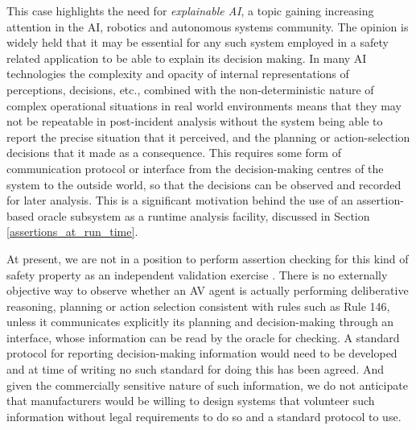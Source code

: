 This case highlights the need for \emph{explainable AI}, a topic gaining increasing attention in the AI, robotics and autonomous systems community. The opinion is widely held \cite{deeks2019judicial, o2019legal, wortham2020transparency} that it may be essential for any such system employed in a safety related application to be able to explain its decision making. In many AI technologies the complexity and opacity of internal representations of perceptions, decisions, etc., combined with the non-deterministic nature of complex operational situations in real world environments means that they may not be repeatable in post-incident analysis without the system being able to report the precise situation that it perceived, and the planning or action-selection decisions that it made as a consequence. This requires some form of communication protocol or interface from the decision-making centres of the system to the outside world, so that the decisions can be observed and recorded for later analysis. This is a significant motivation behind the use of an assertion-based oracle subsystem as a runtime analysis facility, discussed in Section \ref{assertions_at_run_time}.

At present, we are not in a position to perform assertion checking for this kind of safety property as an independent validation exercise %
. There is no externally objective way to observe whether an AV agent is actually performing deliberative reasoning, planning or action selection consistent with rules such as Rule 146, unless it communicates explicitly its planning and decision-making through an interface, whose information can be read by the oracle for checking. A standard protocol for reporting decision-making information would need to be developed and at time of writing no such standard for doing this has been agreed. And given the commercially sensitive nature of such information, we do not anticipate that manufacturers would be willing to design systems that volunteer such information without legal requirements to do so and a standard protocol to use.

